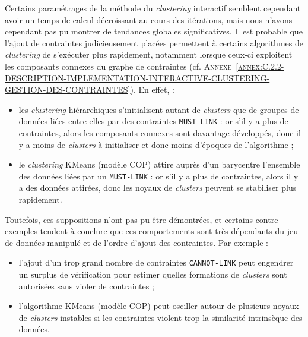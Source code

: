 			\begin{leftBarAuthorOpinion}
				Certains paramétrages de la méthode du \textit{clustering} interactif semblent cependant avoir un temps de calcul décroissant au cours des itérations, mais nous n'avons cependant pas pu montrer de tendances globales significatives.
				Il est probable que l'ajout de contraintes judicieusement placées permettent à certains algorithmes de \textit{clustering} de s'exécuter plus rapidement, notamment lorsque ceux-ci exploitent les composants connexes du graphe de contraintes (cf. \textsc{Annexe~\ref{annex:C.2.2-DESCRIPTION-IMPLEMENTATION-INTERACTIVE-CLUSTERING-GESTION-DES-CONTRAINTES}}).
				En effet, :
				\begin{itemize}
					\item les \textit{clustering} hiérarchiques s'initialisent autant de \textit{clusters} que de groupes de données liées entre elles par des contraintes \texttt{MUST-LINK} : or s'il y a plus de contraintes, alors les composants connexes sont davantage développés, donc il y a moins de \textit{clusters} à initialiser et donc moins d'époques de l'algorithme ;
					\item le \textit{clustering} KMeans (modèle COP) attire auprès d'un barycentre l'ensemble des données liées par un \texttt{MUST-LINK} : or s'il y a plus de contraintes, alors il y a des données attirées, donc les noyaux de \textit{clusters} peuvent se stabiliser plus rapidement.  
				\end{itemize}
				Toutefois, ces suppositions n'ont pas pu être démontrées, et certains contre-exemples tendent à conclure que ces comportements sont très dépendants du jeu de données manipulé et de l'ordre d'ajout des contraintes. Par exemple :
				\begin{itemize}
					\item l'ajout d'un trop grand nombre de contraintes \texttt{CANNOT-LINK} peut engendrer un surplus de vérification pour estimer quelles formations de \textit{clusters} sont autorisées sans violer de contraintes ;
					\item l'algorithme KMeans (modèle COP) peut osciller autour de plusieurs noyaux de \textit{clusters} instables si les contraintes violent trop la similarité intrinsèque des données.
				\end{itemize}
			\end{leftBarAuthorOpinion}
			
